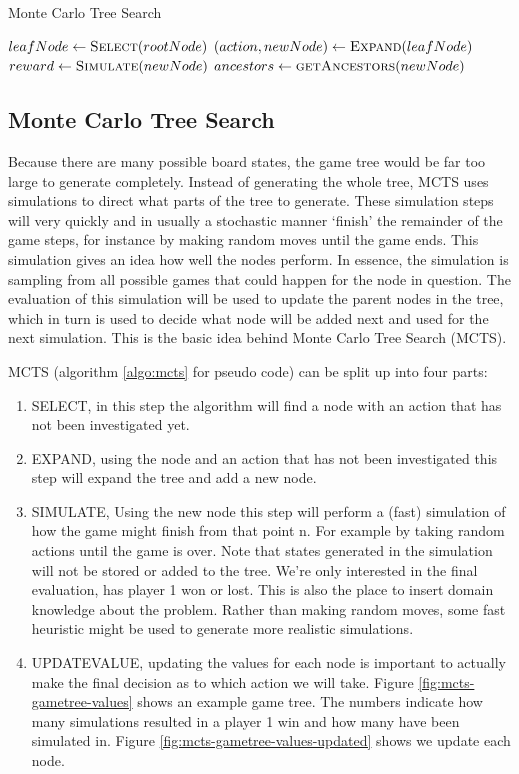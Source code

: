 \documentclass[11pt,a4paper]{article}
\begin{document}
\begin{algorithm}
\caption{Monte Carlo Tree Search}
\label{algo:mcts}
\begin{algorithmic}
\State $leafNode \gets \Call{Select}{rootNode}$
\State $(action, newNode) \gets \Call{Expand}{leafNode}$
\State $reward \gets \Call{Simulate}{newNode}$
\State $ancestors \gets \Call{getAncestors}{newNode}$
\State \Return {}
\EndWhile
\State \Return {}
\EndFunction
\end{algorithmic}
\end{algorithm}
\subsection{Monte Carlo Tree Search}
Because there are many possible board states, the game tree would be far too large to generate completely. Instead of generating the whole tree, MCTS uses simulations to direct what parts of the tree to generate. These simulation steps will very quickly and in usually a stochastic manner `finish' the remainder of the game steps, for instance by making random moves until the game ends. This simulation gives an idea how well the nodes perform. In essence, the simulation is sampling from all possible games that could happen for the node in question. The evaluation of this simulation will be used to update the parent nodes in the tree, which in turn is used to decide what node will be added next and used for the next simulation. This is the basic idea behind Monte Carlo Tree Search (MCTS).

MCTS (algorithm \ref{algo:mcts} for pseudo code) can be split up into four parts:
\begin{enumerate}
    \item SELECT, in this step the algorithm will find a node with an action that has not been investigated yet.
    \item EXPAND, using the node and an action that has not been investigated this step will expand the tree and add a new node.
    \item SIMULATE, Using the new node this step will perform a (fast) simulation of how the game might finish from that point n. For example by taking random actions until the game is over. Note that states generated in the simulation will not be stored or added to the tree. We're only interested in the final evaluation, has player 1 won or lost. This is also the place to insert domain knowledge about the problem. Rather than making random moves, some fast heuristic might be used to generate more realistic simulations.
    \item UPDATEVALUE, updating the values for each node is important to actually make the final decision as to which action we will take. Figure \ref{fig:mcts-gametree-values} shows an example game tree. The numbers indicate how many simulations resulted in a player 1 win and how many have been simulated in. Figure \ref{fig:mcts-gametree-values-updated} shows we update each node. 
\end{enumerate}
\end{document}
